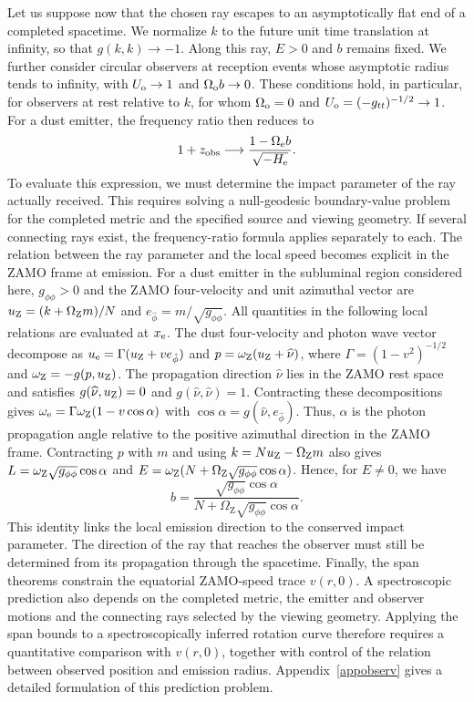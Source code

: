 \documentclass[amsmath,amsfonts,amssymb,aps,pra,superscriptaddress,10pt]{revtex4-2}
\numberwithin{equation}{section}
\theoremstyle{plain}
\theoremstyle{definition}
\theoremstyle{remark}
\theoremstyle{definition}
\newcommand{\OmZ}{\Omega_{\mathrm Z}}
\begin{document}
Let us suppose now that the chosen ray escapes to an asymptotically flat end of a completed spacetime. We normalize $k$ to the future unit time translation at infinity, so that $g(k,k)\to-1$. Along this ray, $E>0$ and $b$ remains fixed. We further consider circular observers at reception events whose asymptotic radius tends to infinity, with $U_{\rm{o}}\to 1$ and $\Omega_{\rm{o}}b\to 0$. These conditions hold, in particular, for observers at rest relative to $k$, for whom $\Omega_{\rm{o}}=0$ and $U_{\rm{o}}=(-g_{tt})^{-1/2}\to 1$. For a dust emitter, the frequency ratio then reduces to
\begin{equation}
1+z_{\rm{obs}}\longrightarrow\frac{1-\Omega_{\rm{e}}b}{\sqrt{-H_{\rm{e}}}}.
\end{equation}
To evaluate this expression, we must determine the impact parameter of the ray actually received. This requires solving a null-geodesic boundary-value problem for the completed metric and the specified source and viewing geometry. If several connecting rays exist, the frequency-ratio formula applies separately to each. The relation between the ray parameter and the local speed becomes explicit in the ZAMO frame at emission. For a dust emitter in the subluminal region considered here, $g_{\phi\phi}>0$ and the ZAMO four-velocity and unit azimuthal vector are
$u_{\rm{Z}}=(k+\OmZ m)/N$ and $e_{\hat{\phi}}=m/\sqrt{g_{\phi\phi}}$. All quantities in the following local relations are evaluated at $x_{\rm{e}}$. The dust four-velocity and photon wave vector decompose as
$u_{\rm{e}}=\Gamma(u_{\rm{Z}}+v e_{\hat{\phi}})$ and
$p=\omega_{\rm{Z}}(u_{\rm{Z}}+\widehat{\nu})$, where $\Gamma=(1-v^2)^{-1/2}$ and $\omega_{\rm{Z}}=-g(p,u_{\rm{Z}})$. The propagation direction $\widehat{\nu}$ lies in the ZAMO rest space and satisfies
$g(\widehat{\nu},u_{\rm{Z}})=0$ and $g(\widehat{\nu},\widehat{\nu})=1$.
Contracting these decompositions gives $\omega_{\rm{e}}=\Gamma\omega_{\rm{Z}}(1-v\cos{\alpha})$ with $\cos{\alpha}=g(\widehat{\nu},e_{\hat{\phi}})$. Thus, $\alpha$ is the photon propagation angle relative to the positive azimuthal direction in the ZAMO frame. Contracting $p$ with $m$ and using $k=Nu_{\rm{Z}}-\OmZ m$ also gives $L=\omega_{\rm{Z}}\sqrt{g_{\phi\phi}}\cos{\alpha}$ and
$E=\omega_{\rm{Z}}(N+\OmZ\sqrt{g_{\phi\phi}}\cos{\alpha})$. Hence, for $E\neq 0$, we have
\begin{equation}
b=\frac{\sqrt{g_{\phi\phi}}\cos{\alpha}}{N+\OmZ\sqrt{g_{\phi\phi}}\cos{\alpha}}.
\end{equation}
This identity links the local emission direction to the conserved impact parameter. The direction of the ray that reaches the observer must still be determined from its propagation through the spacetime. Finally, the span theorems constrain the equatorial ZAMO-speed trace $v(r,0)$. A spectroscopic prediction also depends on the completed metric, the emitter and observer motions and the connecting rays selected by the viewing geometry. Applying the span bounds to a spectroscopically inferred rotation curve therefore requires a quantitative comparison with $v(r,0)$, together with control of the relation between observed position and emission radius. Appendix~\ref{appobserv} gives a detailed formulation of this prediction problem.
\end{document}
